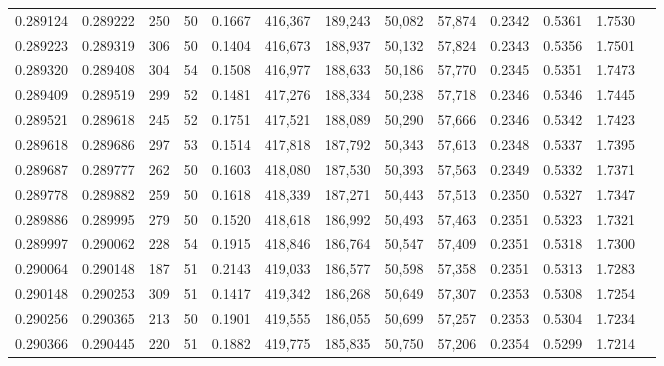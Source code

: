\begin{tabular}{rrrrrrrrrrrrr}
0.289124 & 0.289222 &   250 &  50 &                                     0.1667 & 416,367 & 189,243 &  50,082 &  57,874 & 0.2342 & 0.5361 & 1.7530 \\
0.289223 & 0.289319 &   306 &  50 &                                     0.1404 & 416,673 & 188,937 &  50,132 &  57,824 & 0.2343 & 0.5356 & 1.7501 \\
0.289320 & 0.289408 &   304 &  54 &                                     0.1508 & 416,977 & 188,633 &  50,186 &  57,770 & 0.2345 & 0.5351 & 1.7473 \\
0.289409 & 0.289519 &   299 &  52 &                                     0.1481 & 417,276 & 188,334 &  50,238 &  57,718 & 0.2346 & 0.5346 & 1.7445 \\
0.289521 & 0.289618 &   245 &  52 &                                     0.1751 & 417,521 & 188,089 &  50,290 &  57,666 & 0.2346 & 0.5342 & 1.7423 \\
0.289618 & 0.289686 &   297 &  53 &                                     0.1514 & 417,818 & 187,792 &  50,343 &  57,613 & 0.2348 & 0.5337 & 1.7395 \\
0.289687 & 0.289777 &   262 &  50 &                                     0.1603 & 418,080 & 187,530 &  50,393 &  57,563 & 0.2349 & 0.5332 & 1.7371 \\
0.289778 & 0.289882 &   259 &  50 &                                     0.1618 & 418,339 & 187,271 &  50,443 &  57,513 & 0.2350 & 0.5327 & 1.7347 \\
0.289886 & 0.289995 &   279 &  50 &                                     0.1520 & 418,618 & 186,992 &  50,493 &  57,463 & 0.2351 & 0.5323 & 1.7321 \\
0.289997 & 0.290062 &   228 &  54 &                                     0.1915 & 418,846 & 186,764 &  50,547 &  57,409 & 0.2351 & 0.5318 & 1.7300 \\
0.290064 & 0.290148 &   187 &  51 &                                     0.2143 & 419,033 & 186,577 &  50,598 &  57,358 & 0.2351 & 0.5313 & 1.7283 \\
0.290148 & 0.290253 &   309 &  51 &                                     0.1417 & 419,342 & 186,268 &  50,649 &  57,307 & 0.2353 & 0.5308 & 1.7254 \\
0.290256 & 0.290365 &   213 &  50 &                                     0.1901 & 419,555 & 186,055 &  50,699 &  57,257 & 0.2353 & 0.5304 & 1.7234 \\
0.290366 & 0.290445 &   220 &  51 &                                     0.1882 & 419,775 & 185,835 &  50,750 &  57,206 & 0.2354 & 0.5299 & 1.7214 \\

\end{tabular}

